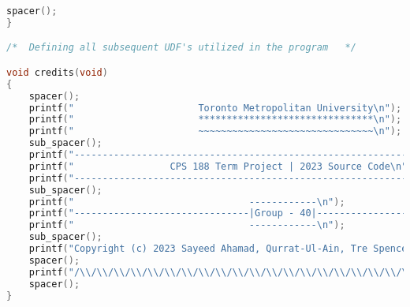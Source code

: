 \begin{lstlisting}[language=C, caption=\textit{CPS 188 Term Project Source Code}]
	spacer();
}

/*  Defining all subsequent UDF's utilized in the program   */

void credits(void)
{
	spacer();
	printf("                      Toronto Metropolitan University\n");
	printf("                      *******************************\n");
	printf("                      ~~~~~~~~~~~~~~~~~~~~~~~~~~~~~~~\n");
	sub_spacer();
	printf("---------------------------------------------------------------------------\n");
	printf("                 CPS 188 Term Project | 2023 Source Code\n");
	printf("---------------------------------------------------------------------------\n");
	sub_spacer();
	printf("                               ------------\n");
	printf("-------------------------------|Group - 40|-------------------------------\n");
	printf("                               ------------\n");
	sub_spacer();
	printf("Copyright (c) 2023 Sayeed Ahamad, Qurrat-Ul-Ain, Tre Spencer, Nourhan Antar\n");
	spacer();
	printf("/\\/\\/\\/\\/\\/\\/\\/\\/\\/\\/\\/\\/\\/\\/\\/\\/\\/\\/\\/\\/\\/\\/\\/\\/\\/\\/\\/\\/\\/\\/\\/\\/\\/\\/\\/\\/\\/\\\n");
	spacer();
}


\end{lstlisting}
